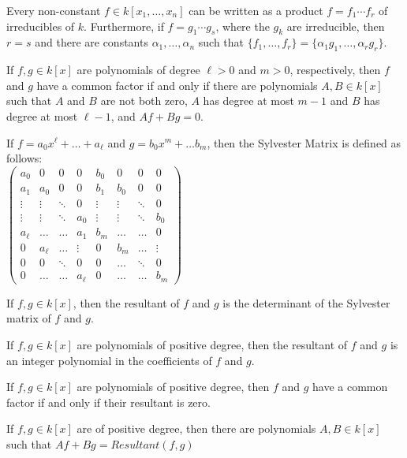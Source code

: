 \documentclass[../main.tex]{subfiles}
\begin{document}
\begin{theorem}
Every non-constant $f\in k[x_1,\hdots ,x_n]$ can be written as a product $f = f_1\cdots f_r$ of irreducibles of $k$. Furthermore, if $f = g_1\cdots g_s$, where the $g_k$ are irreducible, then $r=s$ and there are constants $\alpha_1,\hdots, \alpha_n$ such that $\{f_1,\hdots, f_r\} = \{\alpha_1 g_1, \hdots, \alpha_r g_r\}$.
\end{theorem}

\begin{theorem}
If $f,g \in k[x]$ are polynomials of degree $\ell>0$ and $m>0$, respectively, then $f$ and $g$ have a common factor if and only if there are polynomials $A,B\in k[x]$ such that $A$ and $B$ are not both zero, $A$ has degree at most $m-1$ and $B$ has degree at most $\ell-1$, and $Af+Bg = 0$.
\end{theorem}

\begin{definition}
If $f = a_0 x^{\ell} +\hdots + a_{\ell}$ and $g = b_0 x^m + \hdots b_m$, then the Sylvester Matrix is defined as follows:\\$
\left({\begin{matrix} a_0 & 0 & 0 & 0 & b_0 & 0 & 0 & 0 \\ a_1 & a_0 & 0 & 0 & b_1 & b_0 & 0 & 0 \\ \vdots & \vdots & \ddots & 0 & \vdots & \vdots & \ddots & 0 \\ \vdots & \vdots & \ddots & a_{0} & \vdots & \vdots & \ddots & b_0 \\ a_{\ell} & \hdots & \hdots & a_{1} & b_{m} & \hdots & \hdots & 0 \\ 0 & a_{\ell} & \hdots & \vdots & 0 & b_{m} & \hdots & \vdots\\ 0 & 0 & \ddots & 0 & 0 & \hdots & \ddots & 0 \\ 0 & \hdots & \hdots & a_{\ell} & 0 & \hdots & \hdots & b_{m} \end{matrix}}\right)$ 
\end{definition}

\begin{theorem}
If $f,g \in k[x]$, then the resultant of $f$ and $g$ is the determinant of the Sylvester matrix of $f$ and $g$.
\end{theorem}

\begin{theorem}
If $f,g\in k[x]$ are polynomials of positive degree, then the resultant of $f$ and $g$ is an integer polynomial in the coefficients of $f$ and $g$.
\end{theorem}

\begin{theorem}
If $f,g\in k[x]$ are polynomials of positive degree, then $f$ and $g$ have a common factor if and only if their resultant is zero.
\end{theorem}

\begin{theorem}
If $f,g\in k[x]$ are of positive degree, then there are polynomials $A,B \in k[x]$ such that $Af + Bg = Resultant(f,g)$
\end{theorem}
\end{document}
